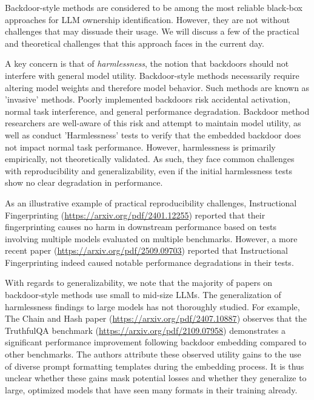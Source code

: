 \documentclass{article}
\begin{document}
Backdoor-style methods are considered to be among the most reliable black-box approaches for LLM ownership identification. However, they are not without challenges that may dissuade their usage. We will discuss a few of the practical and theoretical challenges that this approach faces in the current day.



A key concern is that of \textit{harmlessness}, the notion that backdoors should not interfere with general model utility. Backdoor-style methods necessarily require altering model weights and therefore model behavior. Such methods are known as 'invasive' methods. Poorly implemented backdoors risk accidental activation, normal task interference, and general performance degradation. Backdoor method researchers are well-aware of this risk and attempt to maintain model utility, as well as conduct 'Harmlessness' tests to verify that the embedded backdoor does not impact normal task performance. However, harmlessness is primarily empirically, not theoretically validated. As such, they face common challenges with reproducibility and generalizability, even if the initial harmlessness tests show no clear degradation in performance.


As an illustrative example of practical reproducibility challenges, Instructional Fingerprinting (\url{https://arxiv.org/pdf/2401.12255}) reported that their fingerprinting causes no harm in downstream performance based on tests involving multiple models evaluated on multiple benchmarks. However, a more recent paper (\url{https://arxiv.org/pdf/2509.09703}) reported that Instructional Fingerprinting indeed caused notable performance degradations in their tests.



With regards to generalizability, we note that the majority of papers on backdoor-style methods use small to mid-size LLMs. The generalization of harmlessness findings to large models has not thoroughly studied. For example, The Chain and Hash paper (\url{https://arxiv.org/pdf/2407.10887}) observes that the TruthfulQA benchmark (\url{https://arxiv.org/pdf/2109.07958}) demonstrates a significant performance improvement following backdoor embedding compared to other benchmarks. The authors attribute these observed utility gains to the use of diverse prompt formatting templates during the embedding process. It is thus unclear whether these gains mask potential losses and whether they generalize to large, optimized models that have seen many formats in their training already.
\end{document}
